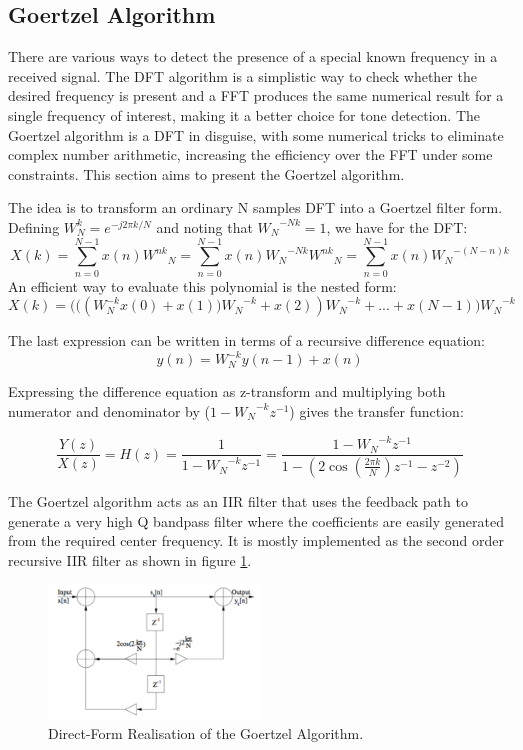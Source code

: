 \documentclass[12pt,a4paper,openright]{article}
\begin{document}
\subsection{Goertzel Algorithm}

There are various ways to detect the presence of a special known frequency in a received signal. The DFT algorithm is a simplistic way to check whether the desired frequency is present and a FFT produces the same numerical result for a single frequency of interest, making it a better choice for tone detection. The Goertzel algorithm is a DFT in disguise, with some numerical tricks to eliminate complex number arithmetic, increasing the efficiency over the FFT under some constraints. This section aims to present the Goertzel algorithm.

The idea is to transform an ordinary N samples DFT into a Goertzel filter form. Defining $W_{N}^{k}={e^{ - j2\pi k/N}}$ and noting that ${W_N}^{ - Nk} = 1$, we have for the DFT:
\[X(k) = \sum\limits_{n = 0}^{N - 1} {x(n){W^{nk}}_N}  = \sum\limits_{n = 0}^{N - 1} {x(n){W_N}^{ - Nk}{W^{nk}}_N}  = \sum\limits_{n = 0}^{N - 1} {x(n){W_N}^{ - (N - n)k}} \]
An efficient way to evaluate this polynomial is the nested form:
\[X(k)=\bigg(\big(({W^{ - k}_N}x(0) + x(1)\big){W_N}^{ - k} + x(2)){W_N}^{ - k} + ... + x(N - 1)\bigg){W_N}^{ - k}\]

The last expression can be written in terms of a recursive difference equation:
\[y(n) = {W^{ - k}_N}y(n - 1) + x(n)\]

Expressing the difference equation as z-transform and multiplying both numerator and denominator by (${1 - {W_N}^{ - k}{z^{ - 1}}}$) gives the transfer function:

\[\frac{{Y(z)}}{{X(z)}} = H(z) = \frac{1}{{1 - {W_N}^{ - k}{z^{ - 1}}}} = \frac{{1 - {W_N}^{ - k}{z^{ - 1}}}}{{1 - (2\cos (\frac{{2\pi k}}{N}){z^{ - 1}} - {z^{ - 2}})}}\]

The Goertzel algorithm acts as an IIR filter that uses the feedback path to generate a very high Q bandpass filter where the coefficients are easily generated from the required center frequency.  It is mostly implemented as the second order recursive IIR filter as shown in figure \ref{IIR}. 
 \begin{figure}[h]
  \centering
    \includegraphics[width=0.5\textwidth]{IIR.pdf}
    \caption{Direct-Form Realisation of the Goertzel Algorithm.}
    \label{IIR}
\end{figure}
\end{document}
